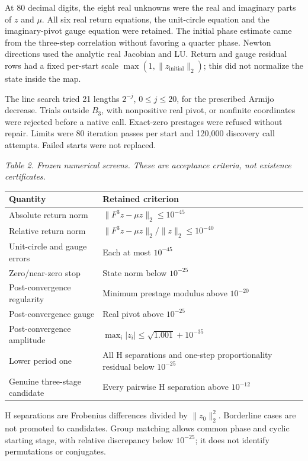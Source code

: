 \documentclass[11pt,a4paper]{article}
\begin{document}
At 80 decimal digits, the eight real unknowns were the real and imaginary parts of $z$ and $\mu$. All six real return equations, the unit-circle equation and the imaginary-pivot gauge equation were retained. The initial phase estimate came from the three-step correlation without favoring a quarter phase. Newton directions used the analytic real Jacobian and LU. Return and gauge residual rows had a fixed per-start scale $\max(1,\|z_{\mathrm{initial}}\|_2)$; this did not normalize the state inside the map.

The line search tried 21 lengths $2^{-j}$, $0\leq j\leq20$, for the prescribed Armijo decrease. Trials outside $B_3$, with nonpositive real pivot, or nonfinite coordinates were rejected before a native call. Exact-zero prestages were refused without repair. Limits were 80 iteration passes per start and 120,000 discovery call attempts. Failed starts were not replaced.

\par\textit{Table 2. Frozen numerical screens. These are acceptance criteria, not existence certificates.}\par
\begingroup\small
\begin{tabularx}{\textwidth}{XX}
\toprule
Quantity & Retained criterion\\\midrule
Absolute return norm & $\|F^3z-\mu z\|_2\leq10^{-45}$\\
Relative return norm & $\|F^3z-\mu z\|_2/\|z\|_2\leq10^{-40}$\\
Unit-circle and gauge errors & Each at most $10^{-45}$\\
Zero/near-zero stop & State norm below $10^{-25}$\\
Post-convergence regularity & Minimum prestage modulus above $10^{-20}$\\
Post-convergence gauge & Real pivot above $10^{-25}$\\
Post-convergence amplitude & $\max_i|z_i|\leq\sqrt{1.001}+10^{-35}$\\
Lower period one & All H separations and one-step proportionality residual below $10^{-25}$\\
Genuine three-stage candidate & Every pairwise H separation above $10^{-12}$\\
\bottomrule\end{tabularx}\endgroup\par
H separations are Frobenius differences divided by $\|z_0\|_2^2$. Borderline cases are not promoted to candidates. Group matching allows common phase and cyclic starting stage, with relative discrepancy below $10^{-25}$; it does not identify permutations or conjugates.
\end{document}
